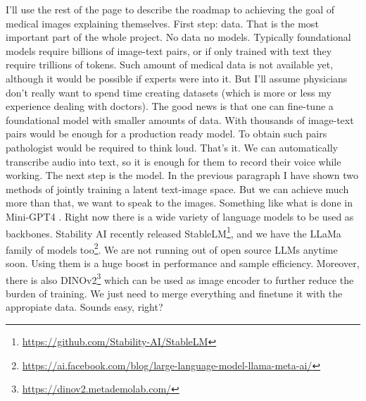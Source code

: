 I'll use the rest of the page to describe the roadmap to achieving the goal of medical images explaining themselves. First step: data. That is the most important part of the whole project. No data no models. Typically foundational models require billions of image-text pairs, or if only trained with text they require trillions of tokens. Such amount of medical data is not available yet, although it would be possible if experts were into it. But I'll assume physicians don't really want to spend time creating datasets (which is more or less my experience dealing with doctors). The good news is that one can fine-tune a foundational model with smaller amounts of data. With thousands of image-text pairs would be enough for a production ready model. To obtain such pairs pathologist would be required to think loud. That's it. We can automatically transcribe audio into text, so it is enough for them to record their voice while working. The next step is the model. In the previous paragraph I have shown two methods of jointly training a latent text-image space. But we can achieve much more than that, we want to speak to the images. Something like what is done in Mini-GPT4 \cite{zhu2023minigpt4}. Right now there is a wide variety of language models to be used as backbones. Stability AI recently released StableLM\footnote{\url{https://github.com/Stability-AI/StableLM}}, and we have the LLaMa family of models too\footnote{\url{https://ai.facebook.com/blog/large-language-model-llama-meta-ai/}}. We are not running out of open source LLMs anytime soon. Using them is a huge boost in performance and sample efficiency. Moreover, there is also DINOv2\footnote{\url{https://dinov2.metademolab.com/}} which can be used as image encoder to further reduce the burden of training. We just need to merge everything and finetune it with the appropiate data. Sounds easy, right?